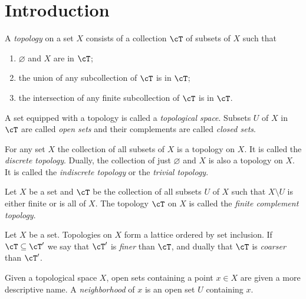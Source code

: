 \documentclass{amsart}
\title{}
\author{Frank Tsai}
\date{\today}
\begin{document}
\maketitle
\tableofcontents

\section{Introduction}
\label{sec:introduction}
\begin{defn}
  A \emph{topology} on a set $X$ consists of a collection $\cT$ of subsets of $X$ such that
  \begin{enumerate}
  \item $\varnothing$ and $X$ are in $\cT$;
  \item the union of any subcollection of $\cT$ is in $\cT$;
  \item the intersection of any finite subcollection of $\cT$ is in $\cT$.
  \end{enumerate}
  A set equipped with a topology is called a \emph{topological space}.
  Subsets $U$ of $X$ in $\cT$ are called \emph{open sets} and their complements are called \emph{closed sets}.
\end{defn}

\begin{eg}
  For any set $X$ the collection of all subsets of $X$ is a topology on $X$.
  It is called the \emph{discrete topology}.
  Dually, the collection of just $\varnothing$ and $X$ is also a topology on $X$.
  It is called the \emph{indiscrete topology} or the \emph{trivial topology}.
\end{eg}

\begin{eg}
  Let $X$ be a set and $\cT$ be the collection of all subsets $U$ of $X$ such that $X \setminus U$ is either finite or is all of $X$.
  The topology $\cT$ on $X$ is called the \emph{finite complement topology}.
\end{eg}

\begin{defn}
  Let $X$ be a set.
  Topologies on $X$ form a lattice ordered by set inclusion.
  If $\cT \subseteq \cT'$ we say that $\cT'$ is \emph{finer} than $\cT$, and dually that $\cT$ is \emph{coarser} than $\cT'$.
\end{defn}

\begin{defn}
  Given a topological space $X$, open sets containing a point $x \in X$ are given a more descriptive name.
  A \emph{neighborhood} of $x$ is an open set $U$ containing $x$.
\end{defn}
\end{document}

